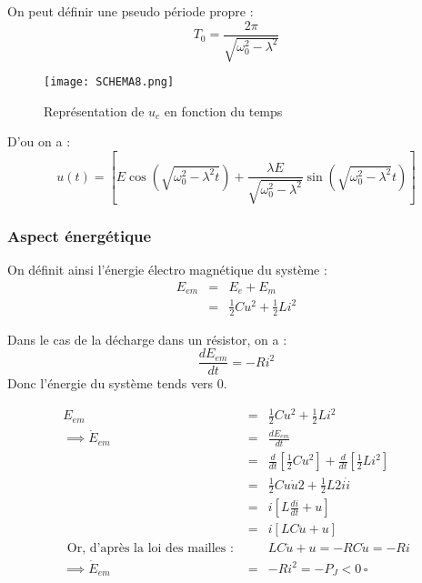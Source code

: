 On peut définir une pseudo période propre : 
\[
    T_{0}  =\frac{2\pi}{\sqrt{\omega_{\text{0}}^{2}-\lambda^{2}}}
\]

\begin{figure}[!htb]
    \centering
    \texttt{[image: SCHEMA8.png]}
    \caption{Représentation de \(u_{c}\) en fonction du temps }
    \label{fig:SCHEMA8}
\end{figure}


D'ou on a : 
\[
    u(t) = \left[ E \cos \left( \sqrt{\omega_{\text{0}}^{2}-\lambda^{2} t} \right) + \frac{\lambda E}{\sqrt{\omega_{\text{0}}^{2}-\lambda^{2}}} \sin \left( \sqrt{\omega_{\text{0}}^{2}-\lambda^{2}} t \right) \right]
\]

\subsubsection{Aspect énergétique}

\begin{definition}
    On définit ainsi l'énergie électro magnétique du système : 
    \begin{eqnarray*}
        E_{em} &=& E_{e} + E_{m} \\
        &=& \frac{1}{2}Cu^{2} + \frac{1}{2}Li^{2}
    \end{eqnarray*}
\end{definition}

\begin{corollary}
    Dans le cas de la décharge dans un résistor, on a : 
    \[
        \frac{dE_{em}}{dt} = -Ri^{2}
    \]
    Donc l'énergie du système tends vers \(0\).
\end{corollary}

\begin{explanation}
    \begin{eqnarray*}
        E_{em} &=& \frac{1}{2}Cu^{2} + \frac{1}{2}Li^{2} \\
        \implies \dot{E}_{em} &=& \frac{dE_{em}}{dt} \\
        &=& \frac{d}{dt}\left[ \frac{1}{2}Cu^{2} \right] + \frac{d}{dt}\left[ \frac{1}{2}Li^{2} \right] \\
        &=& \frac{1}{2}Cu\dot{u} 2 + \frac{1}{2}L 2 i \dot{i}\\
        &=& i \left[ L \frac{di}{dt} + u \right] \\
        &=& i \left[ LC \ddot{u} + u \right]\\
        \text{ Or, d'après la loi des mailles :  }&& LC \ddot{u} + u = -RC \dot{u} = -Ri\\
        \implies \dot{E}_{em} &=& -Ri^{2} = -P_{J} <0 \,\square
    \end{eqnarray*}
    
\end{explanation}